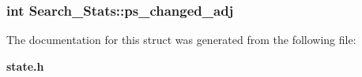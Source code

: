 \subsubsection{\setlength{\rightskip}{0pt plus 5cm}int {\bf Search\_\-Stats::ps\_\-changed\_\-adj}}\label{structSearch__Stats_106a11648daf88de18c46e80dded0beb}




The documentation for this struct was generated from the following file:\begin{CompactItemize}
\item 
{\bf state.h}\end{CompactItemize}
